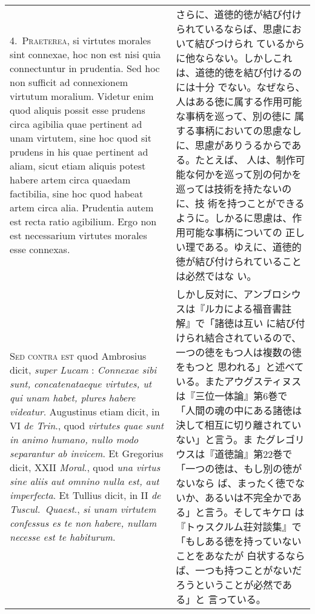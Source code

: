 \documentclass[10pt]{jsarticle}
\begin{document}
\begin{longtable}{p{21em}p{21em}}
\\




4.~{\scshape Praeterea}, si virtutes morales sint connexae, hoc non
est nisi quia connectuntur in prudentia. Sed hoc non sufficit ad
connexionem virtutum moralium. Videtur enim quod aliquis possit esse
prudens circa agibilia quae pertinent ad unam virtutem, sine hoc quod
sit prudens in his quae pertinent ad aliam, sicut etiam aliquis potest
habere artem circa quaedam factibilia, sine hoc quod habeat artem
circa alia. Prudentia autem est recta ratio agibilium. Ergo non est
necessarium virtutes morales esse connexas.


&

 さらに、道徳的徳が結び付けられているならば、思慮において結びつけられ
 ているからに他ならない。しかしこれは、道徳的徳を結び付けるのには十分
 でない。なぜなら、人はある徳に属する作用可能な事柄を巡って、別の徳に
 属する事柄においての思慮なしに、思慮がありうるからである。たとえば、
 人は、制作可能な何かを巡って別の何かを巡っては技術を持たないのに、技
 術を持つことができるように。しかるに思慮は、作用可能な事柄についての
 正しい理である。ゆえに、道徳的徳が結び付けられていることは必然ではな
 い。
 

\\

{\scshape Sed contra est} quod Ambrosius dicit, {\itshape super Lucam}
: {\itshape Connexae sibi sunt, concatenataeque virtutes, ut qui unam
habet, plures habere videatur}. Augustinus etiam dicit, in VI
{\itshape de Trin}., quod {\itshape virtutes quae sunt in animo
humano, nullo modo separantur ab invicem}. Et Gregorius dicit, XXII
{\itshape Moral}., quod {\itshape una virtus sine aliis aut omnino
nulla est, aut imperfecta}. Et Tullius dicit, in II {\itshape de
Tuscul.~Quaest}., {\itshape si unam virtutem confessus es te non
habere, nullam necesse est te habiturum}.

&

 しかし反対に、アンブロシウスは『ルカによる福音書註解』で「諸徳は互い
 に結び付けられ結合されているので、一つの徳をもつ人は複数の徳をもつと
 思われる」と述べている。またアウグスティヌスは『三位一体論』第6巻で
 「人間の魂の中にある諸徳は決して相互に切り離されていない」と言う。ま
 たグレゴリウスは『道徳論』第22巻で「一つの徳は、もし別の徳がないなら
 ば、まったく徳でないか、あるいは不完全かである」と言う。そしてキケロ
 は『トゥスクルム荘対談集』で「もしある徳を持っていないことをあなたが
 白状するならば、一つも持つことがないだろうということが必然である」と
 言っている。


\end{longtable}
\end{document}
